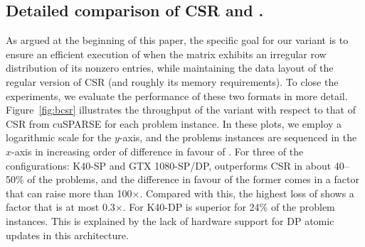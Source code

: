 \subsection{Detailed comparison of CSR and \bcsr.}
As argued at the beginning of this paper,
the specific goal for our \bcsr variant
is to ensure an efficient execution of \spmv
when the matrix exhibits an irregular row distribution of its nonzero entries,
while maintaining the data layout of the regular version of CSR
(and roughly its memory requirements).
To close the experiments, we evaluate the performance of these two formats in more detail.
Figure~\ref{fig:bcsr} illustrates the throughput of
the \bcsr variant with respect to that of CSR from cuSPARSE
for each problem instance.
In these plots, we employ a logarithmic scale for the $y$-axis,
and the problems instances are sequenced in the
$x$-axis in increasing order of difference in favour of \bcsr.
For three of the configurations: K40-SP and GTX 1080-SP/DP,
\bcsr outperforms CSR in about 40--50\% of the problems,
and the difference in favour of the former
comes in a factor that can raise more than 100$\times$.
Compared with this, the highest loss of \bcsr
shows a factor that is at most 0.3$\times$.
For  K40-DP
\bcsr is superior for 24\% of the problem instances.
This is explained by the lack of hardware support for DP atomic updates in this architecture.

